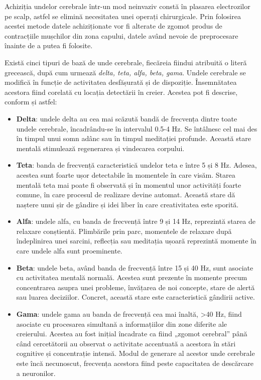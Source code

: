 Achiziția undelor cerebrale într-un mod neinvaziv constă în plasarea electrozilor pe scalp, astfel se elimină necesitatea unei operați chirurgicale. Prin folosirea acestei metode datele achiziționate vor fi alterate de zgomot produs de contracțiile mușchilor din zona capului, datele având nevoie de preprocesare înainte de a putea fi folosite.

Există cinci tipuri de bază de unde cerebrale, fiecăreia fiindui atribuită o literă grecească, după cum urmează \textit{delta, teta, alfa, beta, gama}. Undele cerebrale se modifică în funcție de activitatea desfășurată și de dispoziție. Însemnătatea acestora fiind corelată cu locația detectării în creier. Acestea pot fi descrise, conform \cite{online:brainworks} și \cite{online:scientific-american} astfel:
\begin{itemize}
\item\textbf{Delta}: undele delta au cea mai scăzută bandă de frecvența dintre toate undele cerebrale, încadrându-se în intervalul 0.5-4 \si{\hertz}. Se întâlnesc cel mai des în timpul unui somn adânc sau în timpul meditației profunde. Această stare mentală stimulează regenerarea și vindecarea corpului.

\item\textbf{Teta}: banda de frecvență caracteristică undelor teta e între 5 și 8 \si{\hertz}. Adesea, acestea sunt foarte ușor detectabile în momentele în care visăm. Starea mentală teta mai poate fi observată și în momentul unor activități foarte comune, în care procesul de realizare devine automat. Această stare dă naștere unui șir de gândire și idei liber în care creativitatea este sporită.

\item\textbf{Alfa}: undele alfa, cu banda de frecvență între 9 și 14 \si{\hertz}, reprezintă starea de relaxare conștientă. Plimbările prin parc, momentele de relaxare după îndeplinirea unei sarcini, reflecția  sau meditația ușoară reprezintă momente în care undele alfa sunt proeminente.

\item\textbf{Beta}: undele beta, având banda de frecvență între 15 și 40 \si{\hertz}, sunt asociate cu activitatea mentală normală. Acestea sunt prezente în momente precum concentrarea asupra unei probleme, învățarea de noi concepte, stare de alertă sau luarea deciziilor. Concret, această stare este caracteristică gândirii active.

\item\textbf{Gama}: undele gama au banda de frecvență cea mai înaltă, >40 \si{\hertz}, fiind asociate cu procesarea simultană a informațiilor din zone diferite ale creierului. Acestea au fost inițial încadrate ca fiind „zgomot cerebral” până când cercetătorii au observat o activitate accentuată a acestora în stări cognitive și concentrație intensă. Modul de generare al acestor unde cerebrale este încă necunoscut, frecvența acestora fiind peste capacitatea de descărcare a neuronilor.
\end{itemize}
